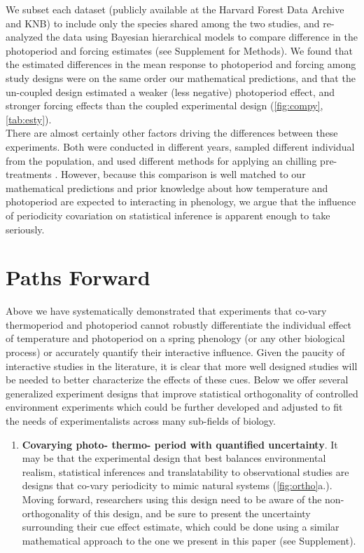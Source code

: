 \documentclass[11pt]{article}
\begin{document}
{We subset each dataset (publicly available at the Harvard Forest Data Archive and KNB) to include only the species shared among the two studies, and re-analyzed the data using Bayesian hierarchical models to compare difference in the photoperiod and forcing estimates (see Supplement for Methods). We found that the estimated differences in the mean response to photoperiod and forcing%
among study designs were on the same order our mathematical predictions, and that the un-coupled design estimated a weaker (less negative) photoperiod effect, and stronger forcing %
effects than the coupled experimental design (\ref{fig:compy},\ref{tab:esty}). \\

There are almost certainly other factors driving the differences between these experiments. Both were conducted in different years, sampled different individual from the population, and used different methods for applying an chilling pre-treatments \citep{Flynn2018,Buonaiuto:2021ug}. However, because this comparison is well matched to our mathematical predictions and prior knowledge about how temperature and photoperiod are expected to interacting in phenology, we argue that the influence of periodicity covariation on statistical inference is apparent enough to take seriously.\\

\section{Paths Forward}
Above we have systematically demonstrated that experiments that co-vary thermoperiod and photoperiod cannot robustly differentiate the individual effect of temperature and photoperiod on a spring phenology (or any other biological process) or accurately quantify their interactive influence. Given the paucity of interactive studies in the literature, it is clear that more well designed studies will be needed to better characterize the effects of these cues. Below we offer several generalized experiment designs that improve statistical orthogonality of controlled environment experiments which could be further developed and adjusted to fit the needs of experimentalists across many sub-fields of biology.
\begin{enumerate}
\item \textbf{Covarying photo- thermo- period with quantified uncertainty}. It may be that the experimental design that best balances environmental realism, statistical inferences and translatability to observational studies are designs that co-vary periodicity to mimic natural systems (\ref{fig:ortho}a.). Moving forward, researchers using this design need to be aware of the non-orthogonality of this design, and be sure to present the uncertainty surrounding their cue effect estimate, which could be done using a similar mathematical approach to the one we present in this paper (see Supplement).


\end{enumerate}}
\end{document}
